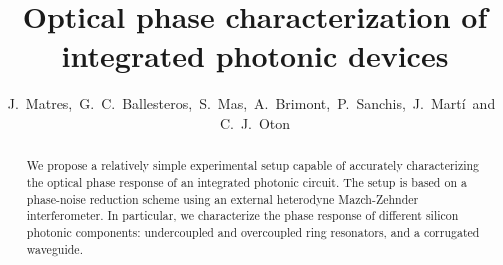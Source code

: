 \documentclass[journal]{IEEEtran}
\begin{document}
\title{Optical phase characterization of integrated photonic devices}
\author{J.~Matres,~G.~C.~Ballesteros,~S.~Mas,~A.~Brimont,~P.~Sanchis,~J.~Mart\'i~and~C.~J.~Oton}

\maketitle


\begin{abstract}

We propose a relatively simple experimental setup capable of accurately characterizing the optical phase response of an integrated photonic circuit. The setup is based on a phase-noise reduction scheme using an external  heterodyne Mazch-Zehnder interferometer. In particular, we characterize the phase response of different silicon photonic components: undercoupled and overcoupled ring resonators, and a corrugated  waveguide.



\end{abstract}

\end{document}
